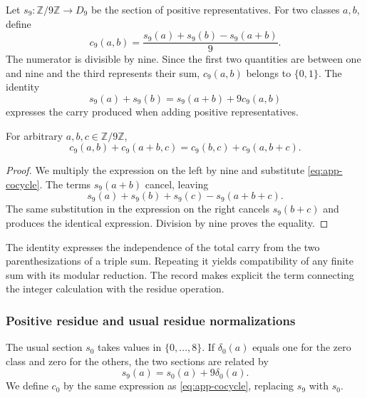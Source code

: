 Let $s_9:\mathbb Z/9\mathbb Z\to D_9$ be the section of positive representatives. For two classes $a,b$, define
\begin{equation}
 c_9(a,b)=\frac{s_9(a)+s_9(b)-s_9(a+b)}9.
 \label{eq:app-cocycle}
\end{equation}
The numerator is divisible by nine. Since the first two quantities are between one and nine and the third represents their sum, $c_9(a,b)$ belongs to $\{0,1\}$. The identity
\[
 s_9(a)+s_9(b)=s_9(a+b)+9c_9(a,b)
\]
expresses the carry produced when adding positive representatives.

\begin{bloqueindivisible}
\begin{teorema}
\label{thm:app-cociclo}
For arbitrary $a,b,c\in\mathbb Z/9\mathbb Z$,
\begin{equation}
 c_9(a,b)+c_9(a+b,c)
 =c_9(b,c)+c_9(a,b+c).
 \label{eq:app-cocycle-associativity}
\end{equation}
\end{teorema}

\begin{proof}
We multiply the expression on the left by nine and substitute \eqref{eq:app-cocycle}. The terms $s_9(a+b)$ cancel, leaving
\[
 s_9(a)+s_9(b)+s_9(c)-s_9(a+b+c).
\]
The same substitution in the expression on the right cancels $s_9(b+c)$ and produces the identical expression. Division by nine proves the equality.
\end{proof}
\end{bloqueindivisible}

The identity expresses the independence of the total carry from the two parenthesizations of a triple sum. Repeating it yields compatibility of any finite sum with its modular reduction. The record makes explicit the term connecting the integer calculation with the residue operation.

\subsubsection{Positive residue and usual residue normalizations}

The usual section $s_0$ takes values in $\{0,\ldots,8\}$. If $\delta_0(a)$ equals one for the zero class and zero for the others, the two sections are related by
\begin{equation}
 s_9(a)=s_0(a)+9\delta_0(a).
\end{equation}
We define $c_0$ by the same expression as \eqref{eq:app-cocycle}, replacing $s_9$ with $s_0$.

